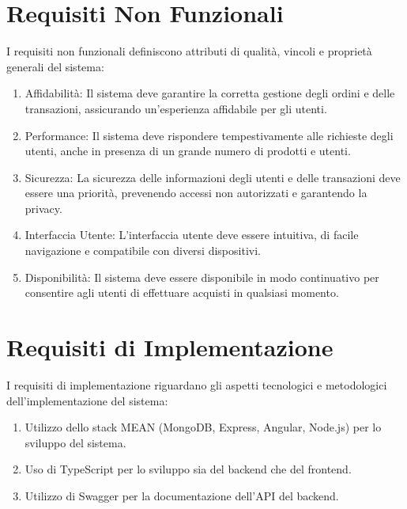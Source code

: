 \section{Requisiti Non Funzionali}
I requisiti non funzionali definiscono attributi di qualità, vincoli e proprietà generali del sistema:
\begin{enumerate}
    \item Affidabilità: Il sistema deve garantire la corretta gestione degli ordini e delle transazioni, assicurando un'esperienza affidabile per gli utenti.
    \item Performance: Il sistema deve rispondere tempestivamente alle richieste degli utenti, anche in presenza di un grande numero di prodotti e utenti.
    \item Sicurezza: La sicurezza delle informazioni degli utenti e delle transazioni deve essere una priorità, prevenendo accessi non autorizzati e garantendo la privacy.
    \item Interfaccia Utente: L'interfaccia utente deve essere intuitiva, di facile navigazione e compatibile con diversi dispositivi.
    \item Disponibilità: Il sistema deve essere disponibile in modo continuativo per consentire agli utenti di effettuare acquisti in qualsiasi momento.
\end{enumerate}

\section{Requisiti di Implementazione}
I requisiti di implementazione riguardano gli aspetti tecnologici e metodologici dell'implementazione del sistema:
\begin{enumerate}
    \item Utilizzo dello stack MEAN (MongoDB, Express, Angular, Node.js) per lo sviluppo del sistema.
    \item Uso di TypeScript per lo sviluppo sia del backend che del frontend.
    \item Utilizzo di Swagger per la documentazione dell'API del backend.
\end{enumerate}